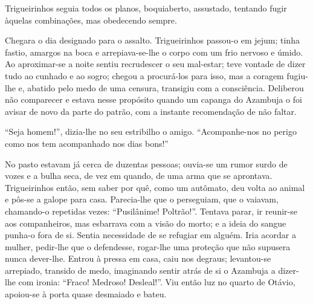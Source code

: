 {Trigueirinhos seguia todos os planos, boquiaberto, assustado,
tentando fugir àquelas combinações, mas obedecendo sempre.

Chegara o dia designado para o assalto. Trigueirinhos passou-o
em jejum; tinha fastio, amargos na boca e arrepiava-se-lhe o corpo com
um frio nervoso e úmido. Ao aproximar-se a noite sentiu
recrudescer o seu mal-estar; teve vontade de dizer tudo ao cunhado e ao
sogro; chegou a procurá-los para isso, mas a coragem fugiu-lhe
e, abatido pelo medo de uma censura, transigiu com a
consciência. Deliberou não comparecer e estava nesse propósito
quando um capanga do Azambuja o foi avisar de novo da parte do patrão,
com a instante recomendação de não faltar.

``Seja homem!'', dizia-lhe no seu estribilho o amigo.
``Acompanhe-nos no perigo como nos tem acompanhado nos dias bons!''


No pasto estavam já cerca de duzentas pessoas; ouvia-se
um rumor surdo de vozes e a bulha seca, de vez em quando, de
uma arma que se aprontava. Trigueirinhos então, sem saber por
quê, como um autômato, deu volta ao animal e
pôs-se a galope para casa. Parecia-lhe que o perseguiam, que o
vaiavam, chamando-o repetidas vezes: ``Pusilânime! Poltrão!''. Tentava
parar, ir reunir-se aos companheiros, mas esbarrava com a visão do
morto; e a ideia do sangue punha-o fora de si. Sentia
necessidade de se refugiar em alguém. Iria acordar a mulher,
pedir-lhe que o defendesse, rogar-lhe uma proteção que não supusera
nunca dever-lhe. Entrou à pressa em casa, caiu nos degraus; levantou-se
arrepiado, transido de medo, imaginando sentir atrás de si o Azambuja a
dizer-lhe com ironia: ``Fraco! Medroso! Desleal!''. Viu então luz no
quarto de Otávio, apoiou-se à porta quase
desmaiado e bateu.

}
